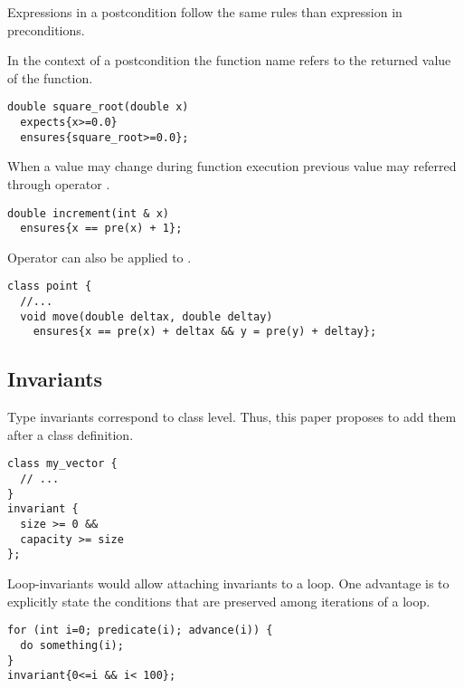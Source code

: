 Expressions in a postcondition follow the same rules than expression in preconditions.

In the context of a postcondition the function name refers to the returned
value of the function.

\begin{lstlisting}
double square_root(double x)
  expects{x>=0.0}
  ensures{square_root>=0.0};
\end{lstlisting}

When a value may change during function execution previous value may referred
through operator .

\begin{lstlisting}
double increment(int & x)
  ensures{x == pre(x) + 1};
\end{lstlisting}

Operator  can also be applied to .

\begin{lstlisting}
class point {
  //...
  void move(double deltax, double deltay)
    ensures{x == pre(x) + deltax && y = pre(y) + deltay};
\end{lstlisting}

\subsection{Invariants}

Type invariants correspond to class level. Thus, this paper proposes to add
them after a class definition.

\begin{lstlisting}
class my_vector {
  // ...
}
invariant {
  size >= 0 &&
  capacity >= size
};
\end{lstlisting}

Loop-invariants would allow attaching invariants to a loop. One advantage is to explicitly state the conditions
that are preserved among iterations of a loop.

\begin{lstlisting}
for (int i=0; predicate(i); advance(i)) {
  do something(i);
}
invariant{0<=i && i< 100};
\end{lstlisting}

